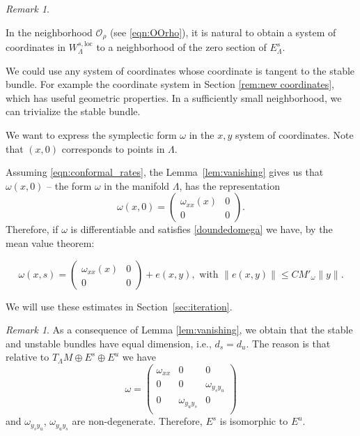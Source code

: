 \documentclass[11pt]{amsart}
\theoremstyle{definition}
\theoremstyle{remark}
\newtheorem{rem}[thm]{Remark}
\numberwithin{equation}{section}
\newcommand{\OO}{\mathcal{O}}
\begin{document}
\begin{rem}
\label{rem:estimates_omega}

In the neighborhood $\OO_\rho$ (see \eqref{eqn:OOrho}), it is natural to obtain a system of coordinates
in $W^{s,\mathrm{loc}}_\Lambda$ to a neighborhood of
the zero section of $E^s_\Lambda$.

We could use any system of coordinates whose coordinate is tangent to
the stable bundle. For example the coordinate system in Section \ref{rem:new coordinates}, which has  useful geometric properties.
In a sufficiently small neighborhood, we can trivialize the stable bundle.


We want to express the symplectic form $\omega$ in
the $x,y$ system of coordinates. Note that $(x,0)$ corresponds to
points in $\Lambda$.

Assuming \eqref{eqn:conformal_rates},
the Lemma~\ref{lem:vanishing} gives us that $\omega(x,0)$
  -- the form $\omega$ in  the manifold $\Lambda$, has the representation
  \[
  \omega(x,0) = \begin{pmatrix}
    \omega_{xx}(x)  & 0 \\
    0 & 0
  \end{pmatrix}.
  \]
  Therefore, if $\omega$  is differentiable and satisfies \eqref{doundedomega}
  we have, by the mean value theorem:

\begin{equation}
  \label{eqn:decomposition2}
  \omega(x,s)= \begin{pmatrix}
    \omega_{xx}(x)  & 0 \\
    0 & 0
  \end{pmatrix}
  + e(x,y), \textrm{ with } \|e(x,y) \| \le C M'_\omega \|y\| .
\end{equation}

We will use these estimates in Section~\ref{sec:iteration}.
\end{rem}



\begin{rem}\label{rem:ds=du}
As a consequence of Lemma \ref{lem:vanishing}, we obtain that the stable and unstable bundles have equal dimension, i.e., $d_s=d_u$.
The reason is that relative to $T_\Lambda M\oplus E^s\oplus E^u$ we have
\[\omega=\begin{pmatrix}
      \omega_{xx} & 0 & 0 \\
      0 & 0 & \omega_{y_s y_u} \\
      0 &\omega_{y_uy_s}& 0 \\
    \end{pmatrix}
    \]
and $\omega_{y_sy_u}$, $\omega_{y_uy_s} $ are non-degenerate.
Therefore, $E^s$ is isomorphic to $E^u$.
\end{rem}
\end{document}
